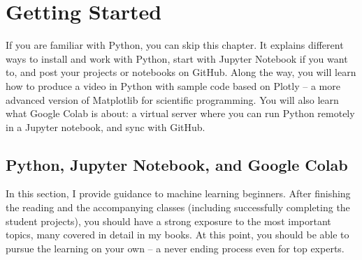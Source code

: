 \documentclass[oneside,10pt]{book}
\begin{document}


\hypersetup{linkcolor=red}
\renewcommand{\baselinestretch}{1.00}\normalsize
\tableofcontents 
\renewcommand{\baselinestretch}{1.00}\normalsize



\chapter{Getting Started} %

If you are familiar with Python, you can skip this chapter. It explains different ways to install and work with Python, start with
 Jupyter Notebook if you want to, and post your projects or notebooks on GitHub. Along the way, you will learn how to produce a video in Python with sample code based on  Plotly -- a more advanced version of Matplotlib for scientific programming. You will also learn what Google Colab is about: a virtual server where you can run Python remotely in a Jupyter notebook, and sync with GitHub.


\section{Python, Jupyter Notebook, and Google Colab}

In this section, I provide guidance to machine learning beginners. After finishing the reading and the accompanying classes (including successfully completing the student projects), you should have a strong exposure to the most important topics, many covered in detail in my books. At this point, you should be able to pursue the learning on your own -- a never ending process even for top experts.

\end{document}
